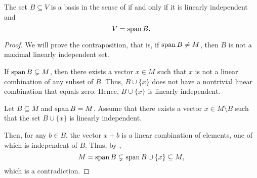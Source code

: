 \begin{proposition}\label{thm:vector_space_basis}
  The set \( B \subseteq V \) is a basis in the sense of  if and only if it is linearly independent and
  \begin{equation*}
    V = \operatorname{span}{B}.
  \end{equation*}
\end{proposition}
\begin{proof}
  \SufficiencySubProof We will prove the contraposition, that is, if \( \operatorname{span}{B} \neq M \), then \( B \) is not a maximal linearly independent set.

  If \( \operatorname{span}{B} \subsetneq M \), then there exists a vector \( x \in M \) such that \( x \) is not a linear combination of any subset of \( B \). Thus, \( B \cup \{ x \} \) does not have a nontrivial linear combination that equals zero. Hence, \( B \cup \{ x \} \) is linearly independent.

  \NecessitySubProof Let \( B \subseteq M \) and \( \operatorname{span}{B} = M \). Assume that there exists a vector \( x \in M \setminus B \) such that the set \( B \cup \{ x \} \) is linearly independent.

  Then, for any \( b \in B \), the vector \( x + b \) is a linear combination of elements, one of which is independent of \( B \). Thus, by ,
  \begin{equation*}
    M = \operatorname{span}{B} \subsetneq \operatorname{span}{B \cup \{ x \}} \subseteq M,
  \end{equation*}
  which is a contradiction.
\end{proof}

